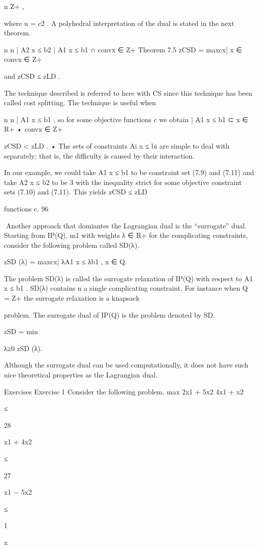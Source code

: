 \documentclass[titlepage]{book}
\theoremstyle{plain}
\theoremstyle{definition}
\theoremstyle{remark}
\begin{document}
n
Z+
,

where u = c2 .
A polyhedral interpretation of the dual is stated in the next theorem.

n
n
| A2 x ≤ b2 
| A1 x ≤ b1  ∩ convx ∈ Z+
Theorem 7.5 zCSD = maxcx| x ∈ convx ∈ Z+

and zCSD ≤ zLD .

The technique described is referred to here with CS since this technique has been called cost splitting.
The technique is useful when

n
n
| A1 x ≤ b1 , so for some objective functions c we obtain
| A1 x ≤ b1  ⊂ x ∈ R+
• convx ∈ Z+

zCSD < zLD .
• The sets of constraints Ai x ≤ bi are simple to deal with separately; that is, the difficulty is caused
by their interaction.

In our example, we could take A1 x ≤ b1 to be constraint set (7.9) and (7.11) and take A2 x ≤ b2 to be
3
with the inequality strict for some objective
constraint sets (7.10) and (7.11). This yields zCSD ≤ zLD

functions c.
96

Another approach that domiantes the Lagrangian dual is the “surrogate” dual. Starting from IP(Q),
m1
with weights λ ∈ R+
for the complicating constraints, consider the following problem called SD(λ).

zSD (λ) = max{cx| λA1 x ≤ λb1 , x ∈ Q}.

The problem SD(λ) is called the surrogate relaxation of IP(Q) with respect to A1 x ≤ b1 . SD(λ) contains
n
a single complicating constraint. For instance when Q = Z+
the surrogate relaxation is a knapsack

problem. The surrogate dual of IP(Q) is the problem denoted by SD.

zSD = min

λ≥0 zSD (λ).

Although the surrogate dual can be used computationally, it does not have such nice theoretical properties
as the Lagrangian dual.

Exercises
Exercise 1
Consider the following problem.
max 2x1 + 5x2
4x1 + x2

≤

28

x1 + 4x2

≤

27

x1 − 5x2

≤

1

x
\end{document}
